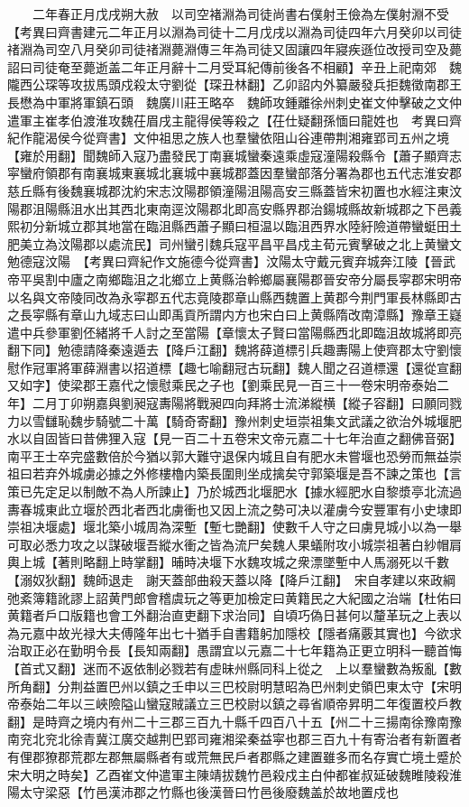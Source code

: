　　二年春正月戊戌朔大赦　以司空褚淵為司徒尚書右僕射王儉為左僕射淵不受　【考異曰齊書建元二年正月以淵為司徒十二月戊戌以淵為司徒四年六月癸卯以司徒禇淵為司空八月癸卯司徒禇淵薨淵傳三年為司徒又固讓四年寢疾遜位改授司空及薨詔曰司徒奄至薨逝盖二年正月辭十二月受耳紀傳前後各不相顧】辛丑上祀南郊　魏隴西公琛等攻拔馬頭戍殺太守劉從【琛丑林翻】乙卯詔内外纂嚴發兵拒魏徵南郡王長懋為中軍將軍鎮石頭　魏廣川莊王略卒　魏師攻鍾離徐州刺史崔文仲擊破之文仲遣軍主崔孝伯渡淮攻魏茌眉戌主龍得侯等殺之【茌仕疑翻孫愐曰龍姓也　考異曰齊紀作龍渴侯今從齊書】文仲祖思之族人也羣蠻依阻山谷連帶荆湘雍郢司五州之境【雍於用翻】聞魏師入寇乃盡發民丁南襄城蠻秦遠乘虛寇潼陽殺縣令【蕭子顯齊志寜蠻府領郡有南襄城東襄城北襄城中襄城郡蓋因羣蠻部落分署為郡也五代志淮安郡慈丘縣有後魏襄城郡沈約宋志汶陽郡領潼陽沮陽高安三縣蓋皆宋初置也水經注東汶陽郡沮陽縣沮水出其西北東南逕汶陽郡北即高安縣界郡治鍚城縣故新城郡之下邑義熙初分新城立郡其地當在臨沮縣西蕭子顯曰桓温以臨沮西界水陸紆險道帶蠻蜓田土肥美立為汶陽郡以處流民】司州蠻引魏兵寇平昌平昌戍主荀元賓擊破之北上黄蠻文勉德寇汶陽　【考異曰齊紀作文施德今從齊書】汶陽太守戴元賓弃城奔江陵【晉武帝平吳割中廬之南鄉臨沮之北鄉立上黄縣治軨鄉屬襄陽郡晉安帝分屬長寜郡宋明帝以名與文帝陵同改為永寜郡五代志竟陵郡章山縣西魏置上黄郡今荆門軍長林縣即古之長寜縣有章山九域志曰山即禹貢所謂内方也宋白曰上黄縣隋改南漳縣】豫章王嶷遣中兵參軍劉伾緒將千人討之至當陽【章懷太子賢曰當陽縣西北即臨沮故城將即亮翻下同】勉德請降秦遠遁去【降戶江翻】魏將薛道標引兵趣夀陽上使齊郡太守劉懷慰作冠軍將軍薛淵書以招道標【趣七喻翻冠古玩翻】魏人聞之召道標還【還從宣翻又如字】使梁郡王嘉代之懷慰乘民之子也【劉乘民見一百三十一卷宋明帝泰始二年】二月丁卯朔嘉與劉昶寇夀陽將戰昶四向拜將士流涕縱横【縱子容翻】曰願同戮力以雪讎恥魏步騎號二十萬【騎奇寄翻】豫州刺史垣崇祖集文武議之欲治外城堰肥水以自固皆曰昔佛狸入寇【見一百二十五卷宋文帝元嘉二十七年治直之翻佛音弼】南平王士卒完盛數倍於今猶以郭大難守退保内城且自有肥水未嘗堰也恐勞而無益崇祖曰若弃外城虜必據之外修樓櫓内築長圍則坐成擒矣守郭築堰是吾不諫之策也【言策已先定足以制敵不為人所諫止】乃於城西北堰肥水【據水經肥水自黎漿亭北流過夀春城東此立堰於西北者西北虜衝也又因上流之勢可决以灌虜今安豐軍有小史埭即崇祖决堰處】堰北築小城周為深塹【塹七艷翻】使數千人守之曰虜見城小以為一舉可取必悉力攻之以謀破堰吾縱水衝之皆為流尸矣魏人果蟻附攻小城崇祖著白紗帽肩輿上城【著則略翻上時掌翻】晡時决堰下水魏攻城之衆漂墜塹中人馬溺死以千數【溺奴狄翻】魏師退走　謝天蓋部曲殺天蓋以降【降戶江翻】　宋自孝建以來政綱弛紊簿籍訛謬上詔黄門郎會稽虞玩之等更加檢定曰黄籍民之大紀國之治端【杜佑曰黄籍者戶口版籍也會工外翻治直吏翻下求治同】自頃巧偽日甚何以釐革玩之上表以為元嘉中故光禄大夫傅隆年出七十猶手自書籍躬加隱校【隱者痛覈其實也】今欲求治取正必在勤明令長【長知兩翻】愚謂宜以元嘉二十七年籍為正更立明科一聽首悔【首式又翻】迷而不返依制必戮若有虚昧州縣同科上從之　上以羣蠻數為叛亂【數所角翻】分荆益置巴州以鎮之壬申以三巴校尉明慧昭為巴州刺史領巴東太守【宋明帝泰始二年以三峽險隘山蠻寇賊議立三巴校尉以鎮之尋省順帝昇明二年復置校戶教翻】是時齊之境内有州二十三郡三百九十縣千四百八十五【州二十三揚南徐豫南豫南兖北兖北徐青冀江廣交越荆巴郢司雍湘梁秦益寜也郡三百九十有寄治者有新置者有俚郡獠郡荒郡左郡無屬縣者有或荒無民戶者郡縣之建置雖多而名存實亡境土蹙於宋大明之時矣】乙酉崔文仲遣軍主陳靖拔魏竹邑殺戍主白仲都崔叔延破魏睢陵殺淮陽太守梁惡【竹邑漢沛郡之竹縣也後漢晉曰竹邑後廢魏盖於故地置戍也